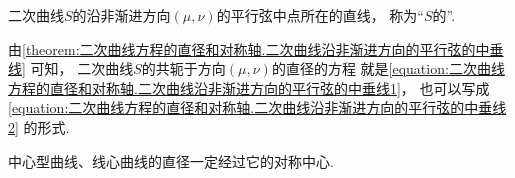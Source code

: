 \begin{definition}
二次曲线\(S\)的沿非渐进方向\((\mu,\nu)\)的平行弦中点所在的直线，
称为“\(S\)的”.
\end{definition}

由\cref{theorem:二次曲线方程的直径和对称轴.二次曲线沿非渐进方向的平行弦的中垂线} 可知，
二次曲线\(S\)的共轭于方向\((\mu,\nu)\)的直径的方程
就是\cref{equation:二次曲线方程的直径和对称轴.二次曲线沿非渐进方向的平行弦的中垂线1}，
也可以写成\cref{equation:二次曲线方程的直径和对称轴.二次曲线沿非渐进方向的平行弦的中垂线2} 的形式.

\begin{corollary}
中心型曲线、线心曲线的直径一定经过它的对称中心.
\end{corollary}

